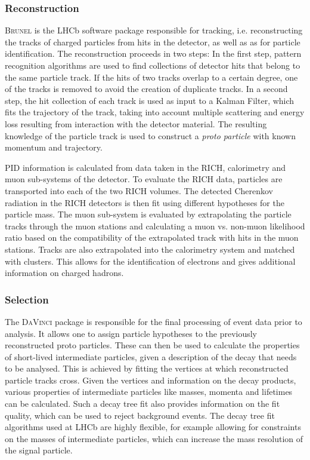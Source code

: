 \subsubsection{Reconstruction}

\textsc{Brunel} is the LHCb software package responsible for tracking, i.e. reconstructing the tracks of charged particles from hits in the detector, as well as as for particle identification.
The reconstruction proceeds in two steps:
In the first step, pattern recognition algorithms are used to find collections of detector hits that belong to the same particle track.
If the hits of two tracks overlap to a certain degree, one of the tracks is removed to avoid the creation of duplicate tracks.
In a second step, the hit collection of each track is used as input to a Kalman Filter, which fits the trajectory of the track, taking into account multiple scattering and energy loss resulting from interaction with the detector material.
The resulting knowledge of the particle track is used to construct a \emph{proto particle} with known momentum and trajectory.

PID information is calculated from data taken in the RICH, calorimetry and muon sub-systems of the detector.
To evaluate the RICH data, particles are transported into each of the two RICH volumes.
The detected Cherenkov radiation in the RICH detectors is then fit using different hypotheses for the particle mass.
The muon sub-system is evaluated by extrapolating the particle tracks through the muon stations and calculating a muon vs. non-muon likelihood ratio based on the compatibility of the extrapolated track with hits in the muon stations.
Tracks are also extrapolated into the calorimetry system and matched with clusters.
This allows for the identification of electrons and gives additional information on charged hadrons.

\subsubsection{Selection}

The \textsc{DaVinci} package is responsible for the final processing of event data prior to analysis.
It allows one to assign particle hypotheses to the previously reconstructed proto particles.
These can then be used to calculate the properties of short-lived intermediate particles, given a description of the decay that needs to be analysed.
This is achieved by fitting the vertices at which reconstructed particle tracks cross.
Given the vertices and information on the decay products, various properties of intermediate particles like masses, momenta and lifetimes can be calculated.
Such a decay tree fit also provides information on the fit quality, which can be used to reject background events.
The decay tree fit algorithms used at LHCb are highly flexible, for example allowing for constraints on the masses of intermediate particles, which can increase the mass resolution of the signal particle.


